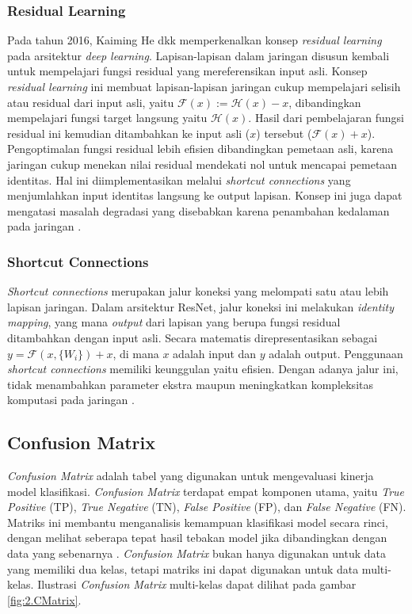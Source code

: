 \subsubsection{Residual Learning} \label{II.Teori5.1}
Pada tahun 2016, Kaiming He dkk memperkenalkan konsep \textit{residual learning}
pada arsitektur \textit{deep learning}. Lapisan-lapisan dalam jaringan disusun 
kembali untuk mempelajari fungsi residual yang mereferensikan input asli. 
Konsep \textit{residual learning} ini membuat lapisan-lapisan jaringan cukup 
mempelajari selisih atau residual dari input asli, yaitu $\mathcal{F}(x) := \mathcal{H}(x) - x$, 
dibandingkan mempelajari fungsi target langsung yaitu $\mathcal{H}(x)$. Hasil 
dari pembelajaran fungsi residual ini kemudian ditambahkan ke input asli ($x$) 
tersebut ($\mathcal{F}(x) + x$). Pengoptimalan fungsi residual lebih efisien 
dibandingkan pemetaan asli, karena jaringan cukup menekan nilai residual 
mendekati nol untuk mencapai pemetaan identitas. Hal ini diimplementasikan 
melalui \textit{shortcut connections} yang menjumlahkan input identitas 
langsung ke output lapisan. Konsep ini juga dapat mengatasi masalah degradasi 
yang disebabkan karena penambahan kedalaman pada jaringan \cite{he2015deepresiduallearningimage}. \par 

\subsubsection{Shortcut Connections} \label{II.Teori5.2}
\textit{Shortcut connections} merupakan jalur koneksi yang melompati satu atau 
lebih lapisan jaringan. Dalam arsitektur ResNet, jalur koneksi ini melakukan 
\textit{identity mapping}, yang mana \textit{output} dari lapisan yang berupa 
fungsi residual ditambahkan dengan input asli. Secara matematis 
direpresentasikan sebagai $y = \mathcal{F}(x, \{W_{i}\}) + x$, di mana $x$ 
adalah input dan $y$ adalah output. Penggunaan \textit{shortcut connections} 
memiliki keunggulan yaitu efisien. Dengan adanya jalur ini, tidak menambahkan 
parameter ekstra maupun meningkatkan kompleksitas komputasi pada jaringan \cite{he2015deepresiduallearningimage}. \par 


\subsection{Confusion Matrix} \label{II.Teori6}
\textit{Confusion Matrix} adalah tabel yang digunakan untuk mengevaluasi
kinerja model klasifikasi. \textit{Confusion Matrix} terdapat empat
komponen utama, yaitu \textit{True Positive} (TP), \textit{True Negative} (TN),
\textit{False Positive} (FP), dan \textit{False Negative} (FN). Matriks ini 
membantu menganalisis kemampuan klasifikasi model secara rinci, dengan 
melihat seberapa tepat hasil tebakan model jika dibandingkan dengan data 
yang sebenarnya \cite{khasanah2021skin}. \textit{Confusion Matrix} bukan hanya digunakan untuk 
data yang memiliki dua kelas, tetapi matriks ini dapat digunakan untuk 
data multi-kelas. Ilustrasi \textit{Confusion Matrix} multi-kelas dapat 
dilihat pada gambar \ref{fig:2.CMatrix}. \par 

